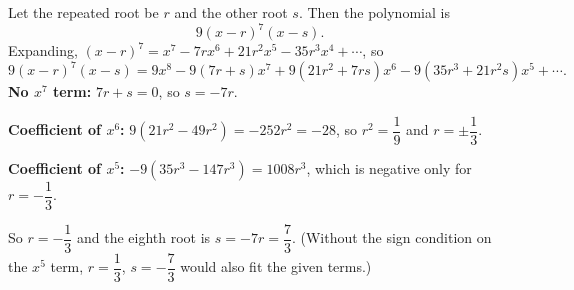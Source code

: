 Let the repeated root be $r$ and the other root $s$. Then the polynomial is
\[
9(x-r)^7(x-s).
\]
Expanding, $(x-r)^7=x^7-7rx^6+21r^2x^5-35r^3x^4+\cdots$, so
\[
9(x-r)^7(x-s)=9x^8-9(7r+s)x^7+9(21r^2+7rs)x^6-9(35r^3+21r^2s)x^5+\cdots .
\]
\textbf{No $x^7$ term:} $7r+s=0$, so $s=-7r$.

\textbf{Coefficient of $x^6$:} $9(21r^2-49r^2)=-252r^2=-28$, so $r^2=\dfrac{1}{9}$ and $r=\pm\dfrac{1}{3}$.

\textbf{Coefficient of $x^5$:} $-9(35r^3-147r^3)=1008r^3$, which is negative only for $r=-\dfrac{1}{3}$.

So $r=-\dfrac{1}{3}$ and the eighth root is $s=-7r=\boxed{\dfrac{7}{3}}$. (Without the sign condition on the $x^5$ term, $r=\dfrac{1}{3}$, $s=-\dfrac{7}{3}$ would also fit the given terms.)
